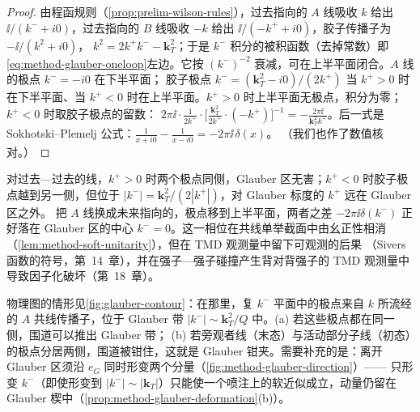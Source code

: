 \begin{proof}
由程函规则（\cref{prop:prelim-wilson-rules}），过去指向的 $A$ 线吸收 $k$ 给出 $\ii/(k^-+i0)$，过去指向的 $B$ 线吸收 $-k$ 给出 $\ii/(-k^++i0)$，胶子传播子为 $-\ii/(k^2+i0)$，
$k^2=2k^+k^--\mathbf k_T^2$；于是 $k^-$ 积分的被积函数（去掉常数）即\cref{eq:method-glauber-oneloop}左边。它按 $(k^-)^{-2}$ 衰减，可在上半平面闭合。$A$ 线的极点 $k^-=-i0$ 在下半平面；
胶子极点 $k^-=(\mathbf k_T^2-i0)/(2k^+)$ 当 $k^+>0$ 时在下半平面、当 $k^+<0$ 时在上半平面。$k^+>0$ 时上半平面无极点，积分为零；$k^+<0$ 时取胶子极点的留数：
$2\pi\ii\cdot\frac1{2k^+}\cdot\bigl[\frac{\mathbf k_T^2}{2k^+}\cdot(-k^+)\bigr]^{-1}=-\frac{2\pi\ii}{\mathbf k_T^2k^+}$。后一式是 Sokhotski--Plemelj 公式：$\frac1{x+i0}-\frac1{x-i0}=-2\pi\ii\,\delta(x)$。
（我们也作了数值核对。）%
\end{proof}

\begin{example}[单胶子交换的极点图]\label{ex:method-glauber-oneloop}
对过去—过去的线，$k^+>0$ 时两个极点同侧，Glauber 区无害；$k^+<0$ 时胶子极点越到另一侧，但位于 $|k^-|=\mathbf k_T^2/(2|k^+|)$，对 Glauber 标度的 $k^+$ 远在 Glauber 区之外。
把 $A$ 线换成未来指向的，极点移到上半平面，两者之差 $-2\pi\ii\delta(k^-)$ 正好落在 Glauber 区的中心 $k^-=0$。这一相位在共线单举截面中由幺正性相消（\cref{lem:method-soft-unitarity}），但在 TMD 观测量中留下可观测的后果
（Sivers 函数的符号，第~14~章），并在强子—强子碰撞产生背对背强子的 TMD 观测量中导致因子化破坏（第~18~章）。

物理图的情形见\cref{fig:glauber-contour}：在那里，复 $k^-$ 平面中的极点来自 $k$ 所流经的 $A$ 共线传播子，位于 Glauber 带 $|k^-|\sim\mathbf k_T^2/Q$ 中。(a) 若这些极点都在同一侧，围道可以推出 Glauber 带；
(b) 若旁观者线（末态）与活动部分子线（初态）的极点分居两侧，围道被钳住，这就是 Glauber 钳夹。需要补充的是：离开 Glauber 区须沿 $e_G$ 同时形变两个分量（\cref{fig:method-glauber-direction}）——
只形变 $k^-$（即使形变到 $|k^-|\sim|\mathbf k_T|$）只能使一个喷注上的软近似成立，动量仍留在 Glauber 楔中（\cref{prop:method-glauber-deformation}(b)）。
\end{example}

